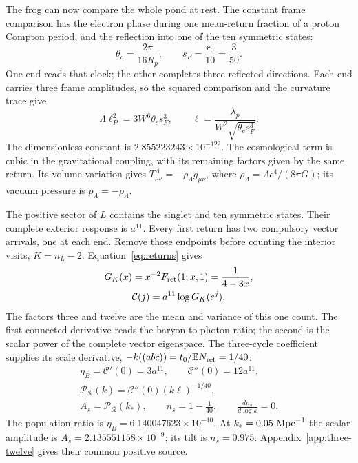 \documentclass[aps,prx,reprint,longbibliography]{revtex4-2}
\providecommand{\E}{\mathbb E}
\providecommand{\Fret}{F_{\rm ret}}
\begin{document}
The frog can now compare the whole pond at rest. The constant frame comparison has the electron phase during one mean-return fraction of a proton Compton period, and the reflection into one of the ten symmetric states:
\begin{equation}
 \theta_c=\frac{2\pi}{16R_p},\qquad s_F=\frac{r_0}{10}=\frac3{50}.
 \label{eq:whole_phase}
\end{equation}
One end reads that clock; the other completes three reflected directions. Each end carries three frame amplitudes, so the squared comparison and the curvature trace give
\begin{equation}
 \boxed{\Lambda\ell_P^2=3W^6\theta_cs_F^3},\qquad
 \ell=\frac{\lambda_p}{W^2\sqrt{\theta_cs_F^3}}.
 \label{eq:Lambda}
\end{equation}
The dimensionless constant is $2.855223243\times10^{-122}$. The cosmological term is cubic in the gravitational coupling, with its remaining factors given by the same return. Its volume variation gives $T^\Lambda_{\mu\nu}=-\rho_\Lambda g_{\mu\nu}$, where $\rho_\Lambda=\Lambda c^4/(8\pi G)$; its vacuum pressure is $p_\Lambda=-\rho_\Lambda$.

The positive sector of $L$ contains the singlet and ten symmetric states. Their complete exterior response is $a^{11}$. Every first return has two compulsory vector arrivals, one at each end. Remove those endpoints before counting the interior visits, $K=n_L-2$. Equation~\eqref{eq:returns} gives
\begin{equation}
\begin{gathered}
 G_K(x)=x^{-2}\Fret(1;x,1)=\frac1{4-3x},\\
 \mathcal C(j)=a^{11}\log G_K(e^j).
 \end{gathered}
 \label{eq:population_source}
\end{equation}
The factors three and twelve are the mean and variance of this one count. The first connected derivative reads the baryon-to-photon ratio; the second is the scalar power of the complete vector eigenspace. The three-cycle coefficient supplies its scale derivative, $-k((abc))=t_0/\E N_{\rm ret}=1/40$:
\begin{equation}
\begin{gathered}
 \eta_B=\mathcal C'(0)=3a^{11},\qquad\mathcal C''(0)=12a^{11},\\
 \mathcal P_{\mathcal R}(k)=\mathcal C''(0)(k\ell)^{-1/40},\\
 A_s=\mathcal P_{\mathcal R}(k_*),\qquad n_s=1-\frac1{40},
 \qquad\frac{dn_s}{d\log k}=0.
 \end{gathered}
 \label{eq:primordial}
\end{equation}
The population ratio is $\eta_B=6.140047623\times10^{-10}$. At $k_*=0.05\ {\rm Mpc}^{-1}$ the scalar amplitude is $A_s=2.135551158\times10^{-9}$; its tilt is $n_s=0.975$. Appendix~\ref{app:three-twelve} gives their common positive source.
\end{document}
